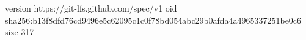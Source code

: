 version https://git-lfs.github.com/spec/v1
oid sha256:b13f8dfd76cd9496e5c62095c1c0f78bd054abc29b0afda4a4965337251be0c6
size 317
